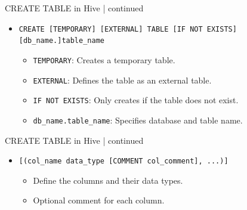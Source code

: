 \begin{frame}{CREATE TABLE in Hive | continued}
	\begin{tcolorbox}[colback=white,colframe=black,title= Part 1:\scriptsize Table Creation Basics]
		\small
		\begin{itemize}
			\item \texttt{CREATE [TEMPORARY] [EXTERNAL] TABLE [IF NOT EXISTS] [db\_name.]table\_name}
			\begin{itemize}
			  \item \texttt{TEMPORARY}: Creates a temporary table.
			  \item \texttt{EXTERNAL}: Defines the table as an external table.
			  \item \texttt{IF NOT EXISTS}: Only creates if the table does not exist.
			  \item \texttt{db\_name.table\_name}: Specifies database and table name.
			\end{itemize}
		  \end{itemize}
	\end{tcolorbox}

  \end{frame}
  \begin{frame}{CREATE TABLE in Hive | continued}
	\begin{tcolorbox}[colback=white,colframe=black,title= Part 2: Column Definitions]
		\small
		\begin{itemize}
		\item \texttt{[(col\_name data\_type [COMMENT col\_comment], ...)]}
			\begin{itemize}
				\item Define the columns and their data types.
				\item Optional comment for each column.
			\end{itemize}
		\end{itemize}
	\end{tcolorbox}
\end{frame}
